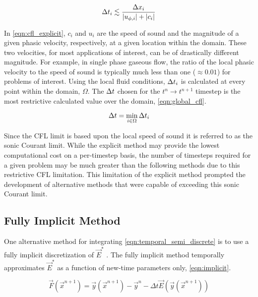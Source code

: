 \begin{equation}
\label{eqn:cfl_explicit}
\dt{}_i \lesssim \frac{\dx{}_i}{|u_{\phi,i}|+|c_i|}
\end{equation}

In \eqref{eqn:cfl_explicit}, $c_i$ and $u_i$ are the speed of sound and the magnitude of a given phasic velocity, respectively, at a given location within the domain.
These two velocities, for most applications of interest, can be of drastically different magnitude.
For example, in single phase gaseous flow, the ratio of the local phasic velocity to the speed of sound is typically much less than one ($\approx 0.01$) for problems of interest.
Using the local fluid conditions, $\dt{}_i$ is calculated at every point within the domain, $\Omega$.
The $\dt{}$ chosen for the $t^{n} \rightarrow t^{n+1}$ timestep is the most restrictive calculated value over the domain, \eqref{eqn:global_cfl}.

\begin{equation}
\label{eqn:global_cfl}
\dt{} = \min_{i \in \Omega} \dt{}_i
\end{equation}

Since the CFL limit is based upon the local speed of sound it is referred to as the sonic Courant limit.
While the explicit method may provide the lowest computational cost on a per-timestep basis, the number of timesteps required for a given problem may be much greater than the following methods due to this restrictive CFL limitation.
This limitation of the explicit method prompted the development of alternative methods that were capable of exceeding this sonic Courant limit.

\subsection{Fully Implicit Method}
\label{subsect:numerics_fully_implicit}
One alternative method for integrating \eqref{eqn:temporal_semi_discrete} is to use a fully implicit discretization of $\vec{E}^{*}$ \cite{Frepoli2003, Barre1990}.
The fully implicit method temporally approximates $\vec{E}^{*}$ as a function  of new-time parameters only, \eqref{eqn:implicit}.

\begin{equation}
\label{eqn:implicit}
\vec{F}(\vec{x}^{n+1}) = \vec{y}(\vec{x}^{n+1}) - \vec{y}^{n} - \Delta t \vec{E}(\vec{y}(\vec{x}^{n+1}))
\end{equation}

